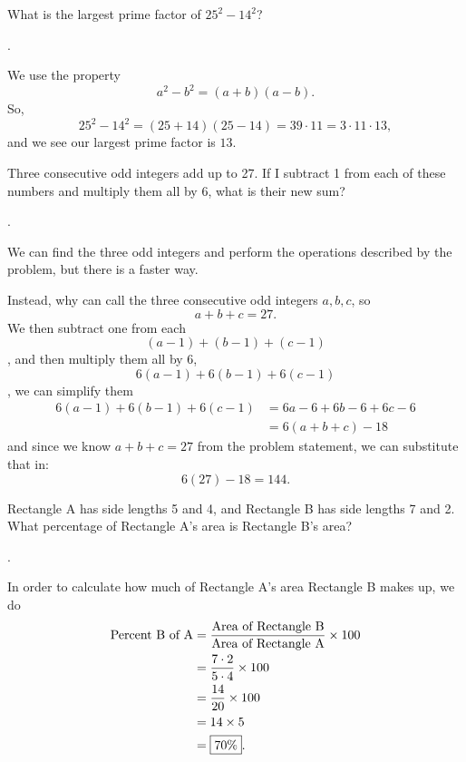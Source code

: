 \documentclass[11pt]{article}
\DeclareRobustCommand{\frac}[3][0pt]{%
  {\begingroup\hspace{#1}#2\hspace{#1}\endgroup\over\hspace{#1}#3\hspace{#1}}}
\begin{document}
\begin{problem}What is the largest prime factor of $25^2-14^2$?
\end{problem}
\begin{answer}
.
\end{answer}
\begin{solution}
We use the property
$$a^2-b^2 = (a+b)(a-b).$$
So,
$$25^2-14^2 = (25+14)(25-14) = 39 \cdot 11 = 3 \cdot 11 \cdot 13,$$
and we see our largest prime factor is $\boxed{13}$.

\end{solution}

\begin{problem}Three consecutive odd integers add up to 27. If I subtract 1 from each of these numbers and multiply them all by 6, what is their new sum?
\end{problem}
\begin{answer}
.
\end{answer}
\begin{solution}
We can find the three odd integers and perform the operations described by the problem, but there is a faster way. \par
Instead, why can call the three consecutive odd integers $a, b, c$, so
$$a+b+c=27.$$
We then subtract one from each
$$(a-1)+(b-1)+(c-1)$$,
and then multiply them all by 6,
$$6(a-1)+6(b-1)+6(c-1)$$,
we can simplify them
\begin{align*}
6(a-1)+6(b-1)+6(c-1) &= 6a-6+6b-6+6c-6 \\
&= 6(a+b+c) - 18
\end{align*}
and since we know $a+b+c=27$ from the problem statement, we can substitute that in:
$$6(27)-18 = \boxed{144}.$$
\end{solution}

\begin{problem}Rectangle A has side lengths 5 and 4, and Rectangle B has side lengths 7 and 2. What percentage of Rectangle A's area is  Rectangle B's area?
\end{problem}
\begin{answer}
.
\end{answer}
\begin{solution}
In order to calculate how much of Rectangle A's area Rectangle B makes up, we do
\begin{align*}
\text{Percent B of A} &= \frac{\text{Area of Rectangle B}}{\text{Area of Rectangle A}} \times 100 \\
&= \frac{7 \cdot 2}{5 \cdot 4} \times 100 \\
&= \frac{14}{20} \times 100 \\
&= 14 \times 5 \\
&= \boxed{70 \%}.
\end{align*}
\end{solution}
\end{document}
